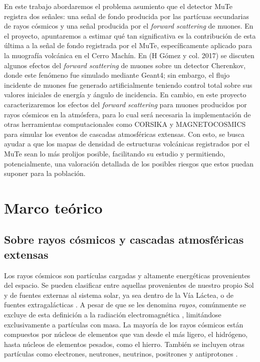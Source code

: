 \documentclass[12pt]{report}
\begin{document}
En este trabajo abordaremos el problema asumiento que el detector MuTe registra dos señales: una señal de fondo producida por las partícuas secundarias de rayos cósmicos y una señal producida por el \textit{forward scattering} de muones. En el proyecto, apuntaremos a estimar qué tan significativa es la contribución de esta última a la señal de fondo registrada por el MuTe, específicamente aplicado para la muografía volcánica en el Cerro Machín. En (H Gómez y col. 2017)  \cite{gomez2017forward} se discuten algunos efectos del \textit{forward scattering} de muones sobre un detector Cherenkov, donde este fenómeno fue simulado mediante Geant4; sin embargo, el flujo incidente de muones fue generado artificialmente teniendo control total sobre sus valores iniciales de energía y ángulo de incidencia. En cambio, en este proyecto caracterizaremos los efectos del \textit{forward scattering} para muones producidos por rayos cósmicos en la atmósfera, para lo cual será necesaria la implementación de otras herramientas computacionales como CORSIKA y MAGNETOCOSMICS para simular los eventos de cascadas atmosféricas extensas. Con esto, se busca ayudar a que los mapas de densidad de estructuras volcánicas registrados por el MuTe sean lo más prolijos posible, facilitando su estudio y permitiendo, potencialmente, una valoración detallada de los posibles riesgos que estos puedan suponer para la población.





\section*{Marco teórico}

\subsection*{Sobre rayos cósmicos y cascadas atmosféricas extensas}

\normalsize

Los rayos cósmicos son partículas cargadas y altamente energéticas provenientes del espacio. Se pueden clasificar entre aquellas provenientes de nuestro propio Sol y de fuentes externas al sistema solar, ya sea dentro de la Vía Láctea, o de fuentes extragalácticas \cite{moldwin2008introduction}. A pesar de que se les denomina \textit{rayos}, comúnmente se excluye de esta definición a la radiación electromagnética \cite{NASACosmicopia}, limitándose exclusivamente a partículas con masa. La mayoría de los rayos cósmicos están compuestos por núcleos de elementos que van desde el más ligero, el hidrógeno, hasta núcleos de elementos pesados, como el hierro. También se incluyen otras partículas como electrones, neutrones, neutrinos, positrones y antiprotones \cite{NASAImagine}.
\end{document}
